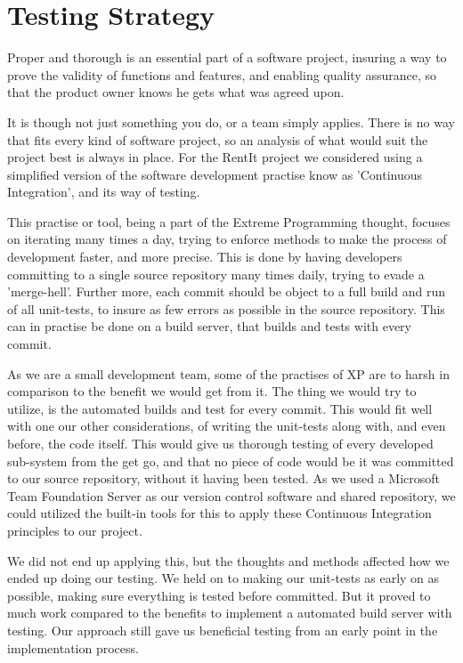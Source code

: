 \section{Testing Strategy} \label{TestingStrategy}
Proper and thorough is an essential part of a software project, insuring a way to prove the validity of functions and features, and enabling quality assurance, so that the product owner knows he gets what was agreed upon. \

It is though not just something you do, or a team simply applies. There is no way that fits every kind of software project, so an analysis of what would suit the project best is always in place. For the RentIt project we considered using a simplified version of the software development practise know as 'Continuous Integration'\cite{MF}, and its way of testing.

This practise or tool, being a part of the Extreme Programming thought, focuses on iterating many times a day, trying to enforce methods to make the process of development faster, and more precise. This is done by having developers committing to a single source repository many times daily, trying to evade a 'merge-hell'. Further more, each commit should be object to a full build and run of all unit-tests, to insure as few errors as possible in the source repository. This can in practise be done on a build server, that builds and tests with every commit.

As we are a small development team, some of the practises of XP are to harsh in comparison to the benefit we would get from it. The thing we would try to utilize, is the automated builds and test for every commit. This would fit well with one our other considerations, of writing the unit-tests along with, and even before, the code itself. This would give us thorough testing of every developed sub-system from the get go, and that no piece of code would be it was committed to our source repository, without it having been tested. As we used a Microsoft Team Foundation Server as our version control software and shared repository, we could utilized the built-in tools for this to apply these Continuous Integration principles to our project.

We did not end up applying this, but the thoughts and methods affected how we ended up doing our testing. We held on to making our unit-tests as early on as possible, making sure everything is tested before committed. But it proved to much work compared to the benefits to implement a automated build server with testing. Our approach still gave us beneficial testing from an early point in the implementation process.\

